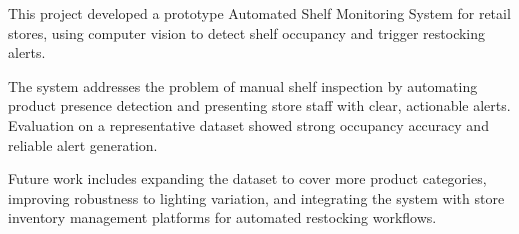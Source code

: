 This project developed a prototype Automated Shelf Monitoring System for retail stores, using computer vision to detect shelf occupancy and trigger restocking alerts.

The system addresses the problem of manual shelf inspection by automating product presence detection and presenting store staff with clear, actionable alerts. Evaluation on a representative dataset showed strong occupancy accuracy and reliable alert generation.

Future work includes expanding the dataset to cover more product categories, improving robustness to lighting variation, and integrating the system with store inventory management platforms for automated restocking workflows.
